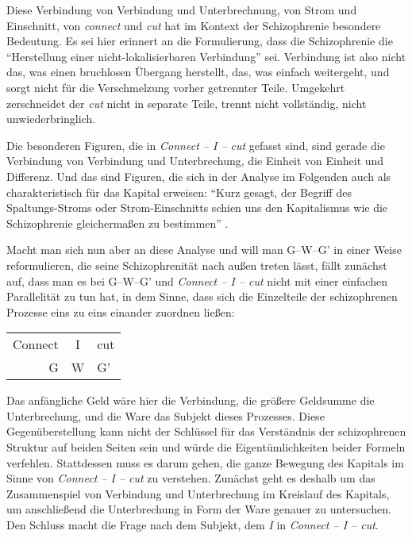 \documentclass[12pt,
               DIV13,
               paper=a4,
               twoside=false,
               onehalfspacing,
               bibliography=totoc,
               toc=graduated,
               draft,
               ]{scrartcl}
\newcommand{\pc}[2]{\parencite[#1]{#2}}
\newcommand{\worries}[1]{\ifdraft{\textcolor{blue}{\texttt{(#1)}}}{}}
\newcommand{\gwg}{G--W--G'\xspace}
\newcommand{\cic}{Connect -- I -- cut\xspace}
\begin{document}

Diese Verbindung von Verbindung und Unterbrechnung, von Strom und
Einschnitt, von \emph{connect} und \emph{cut} hat im Kontext der
Schizophrenie besondere Bedeutung. Es sei hier erinnert an die
Formulierung, dass die Schizophrenie die "`Herstellung einer
nicht-lokalisierbaren Verbindung"' \pc{19}{schizg} sei. Verbindung ist
also nicht das, was einen bruchlosen Übergang herstellt, das, was
einfach weitergeht, und sorgt nicht für die Verschmelzung vorher
getrennter Teile. Umgekehrt zerschneidet der \emph{cut} nicht in
separate Teile, trennt nicht vollständig, nicht unwiederbringlich.

Die besonderen Figuren, die in \emph{\cic} gefasst sind, sind gerade
die Verbindung von Verbindung und Unterbrechung, die Einheit von
Einheit und Differenz. Und das sind Figuren, die sich in der Analyse
im Folgenden auch als charakteristisch für das Kapital erweisen:
"`Kurz gesagt, der Begriff des Spaltungs-Stroms oder Strom-Einschnitts
schien uns den Kapitalismus wie die Schizophrenie gleichermaßen zu
bestimmen"' \pc{317}{ao}.



Macht man sich nun aber an diese Analyse und will man \gwg in einer
Weise reformulieren, die seine Schizophrenität nach außen treten
lässt, fällt zunächst auf, dass man es bei \gwg und \emph{\cic} nicht
mit einer einfachen Parallelität zu tun hat, in dem Sinne, dass sich
die Einzelteile der schizophrenen Prozesse eins zu eins einander
zuordnen ließen:

{\centering\hfill
\begin{tabular}{r@{ -- }c@{ -- }l}
Connect & I & cut\\
G & W & G'
\end{tabular}
\hfill}

Das anfängliche Geld wäre hier die Verbindung, die größere Geldsumme
die Unterbrechung, und die Ware das Subjekt dieses Prozesses. Diese
Gegenüberstellung kann nicht der Schlüssel für das Verständnis der
schizophrenen Struktur auf beiden Seiten sein und würde die
Eigentümlichkeiten beider Formeln verfehlen. Stattdessen muss es darum
gehen, die ganze Bewegung des Kapitals im Sinne von \emph{\cic} zu
verstehen. Zunächst geht es deshalb um das Zusammenspiel von
Verbindung und Unterbrechung im Kreislauf des Kapitals, um
anschließend die Unterbrechung in Form der Ware genauer zu
untersuchen. Den Schluss macht die Frage nach dem Subjekt, dem
\emph{I} in \emph{\cic}.
\end{document}
